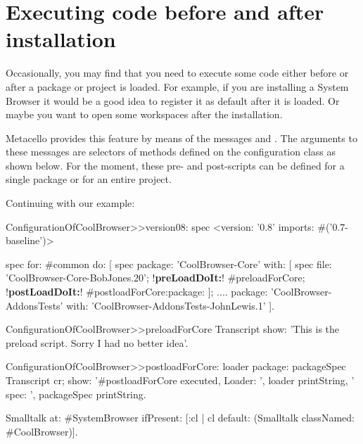 \documentclass[a4paper,10pt,twoside]{book}
\begin{document}
\section{Executing code before and after installation}
Occasionally, you may find that you need to execute some code either before or after a package or project is loaded. For example, if you are installing a System Browser it would be a good idea to register it as default after it is loaded. Or maybe you want to open some workspaces after the installation. 

Metacello provides this feature by means of the messages  and .  The arguments to these messages are selectors of methods defined on the configuration class as shown below. For the moment, these pre- and post-scripts can be defined for a single package or for an entire project. 

Continuing with our example:

\begin{code}{}
ConfigurationOfCoolBrowser>>version08: spec 
       <version: '0.8' imports: #('0.7-baseline')>
       
       spec for: #common do: [
              spec 
                     package: 'CoolBrowser-Core' with: [
                            spec 
                                   file: 'CoolBrowser-Core-BobJones.20';
                                   !\textbf{preLoadDoIt:}! #preloadForCore;
                                   !\textbf{postLoadDoIt:}! #postloadForCore:package: ];
                     ....
                     package: 'CoolBrowser-AddonsTests' with: 'CoolBrowser-AddonsTests-JohnLewis.1' ].
\end{code}

\begin{code}{}
ConfigurationOfCoolBrowser>>preloadForCore
         Transcript show: 'This is the preload script. Sorry I had no better idea'. 
\end{code}

\begin{code}{}
ConfigurationOfCoolBrowser>>postloadForCore: loader package: packageSpec
       Transcript cr; 
              show: '#postloadForCore executed, Loader: ', loader printString, 
                     ' spec: ', packageSpec printString.
       
       Smalltalk at: #SystemBrowser ifPresent: [:cl | cl default: (Smalltalk classNamed: #CoolBrowser)].
\end{code}
\end{document}
